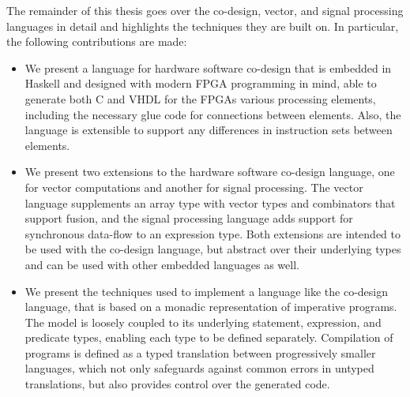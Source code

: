 \documentclass[../paper.tex]{subfiles}
\begin{document}
The remainder of this thesis goes over the co-design, vector, and signal processing languages in detail and highlights the techniques they are built on. In particular, the following contributions are made:

\begin{itemize}
\item We present a language for hardware software co-design that is embedded in Haskell and designed with modern FPGA programming in mind, able to generate both C and VHDL for the FPGAs various processing elements, including the necessary glue code for connections between elements. Also, the language is extensible to support any differences in instruction sets between elements.

\item We present two extensions to the hardware software co-design language, one for vector computations and another for signal processing. The vector language supplements an array type with vector types and combinators that support fusion, and the signal processing language adds support for synchronous data-flow to an expression type. Both extensions are intended to be used with the co-design language, but abstract over their underlying types and can be used with other embedded languages as well.

\item We present the techniques used to implement a language like the co-design language, that is based on a monadic representation of imperative programs. The model is loosely coupled to its underlying statement, expression, and predicate types, enabling each type to be defined separately. Compilation of programs is defined as a typed translation between progressively smaller languages, which not only safeguards against common errors in untyped translations, but also provides control over the generated code.

\end{itemize}
\end{document}
